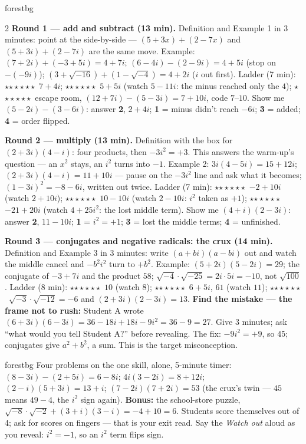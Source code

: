 \documentclass[10pt]{article}
\newcommand{\rung}[1]{{\color{goldacc}\ifcase#1\or$\star$\or$\star\star$\or$\star\star\star$\fi}}
\begin{document}
\begin{skillbox}{forestbg}
\begin{multicols}{2}
\textbf{Round 1 --- add and subtract (13 min).} Definition and Example 1 in 3 minutes: point at
the side-by-side --- $(5+3x)+(2-7x)$ and $(5+3i)+(2-7i)$ are the same move. Example:
$(7+2i)+(-3+5i)=4+7i$; $(6-4i)-(2-9i)=4+5i$ (stop on $-(-9i)$); $(3+\sqrt{-16})+(1-\sqrt{-4})
=4+2i$ ($i$ out first). Ladder (7 min): \rung1\ $7+4i$; \rung2\ $5+5i$ (watch $5-11i$: the minus
reached only the $4$); \rung3\ escape room, $(12+7i)-(5-3i)=7+10i$, code $7$--$10$. Show me
$(5-2i)-(3-6i)$: answer \textbf{2}, $2+4i$; \textbf{1} = minus didn't reach $-6i$; \textbf{3} =
added; \textbf{4} = order flipped.

\textbf{Round 2 --- multiply (13 min).} Definition with the box for $(2+3i)(4-i)$: four
products, then $-3i^2=+3$. This answers the warm-up's question --- an $x^2$ stays, an $i^2$
turns into $-1$. Example 2: $3i(4-5i)=15+12i$; $(2+3i)(4-i)=11+10i$ --- pause on the $-3i^2$
line and ask what it becomes; $(1-3i)^2=-8-6i$, written out twice. Ladder (7 min): \rung1\
$-2+10i$ (watch $2+10i$); \rung2\ $10-10i$ (watch $2-10i$: $i^2$ taken as $+1$); \rung3\
$-21+20i$ (watch $4+25i^2$: the lost middle term). Show me $(4+i)(2-3i)$: answer \textbf{2},
$11-10i$; \textbf{1} = $i^2=+1$; \textbf{3} = lost the middle terms; \textbf{4} = unfinished.

\columnbreak
\textbf{Round 3 --- conjugates and negative radicals: the crux (14 min).} Definition and
Example 3 in 3 minutes: write $(a+bi)(a-bi)$ out and watch the middle cancel and $-b^2i^2$ turn
to $+b^2$. Example: $(5+2i)(5-2i)=29$; the conjugate of $-3+7i$ and the product $58$;
$\sqrt{-4}\cdot\sqrt{-25}=2i\cdot5i=-10$, not $\sqrt{100}$. Ladder (8 min): \rung1\ $10$ (watch
$8$); \rung2\ $6+5i$, $61$ (watch $11$); \rung3\ $\sqrt{-3}\cdot\sqrt{-12}=-6$ and
$(2+3i)(2-3i)=13$. \textbf{Find the mistake --- the frame not to rush:} Student A wrote
$(6+3i)(6-3i)=36-18i+18i-9i^2=36-9=27$. Give 3 minutes; ask ``what would you tell Student A?''
before revealing. The fix: $-9i^2=+9$, so $45$; conjugates give $a^2+b^2$, a sum. This is the
target misconception.
\end{multicols}
\end{skillbox}

\boxguard
\begin{skillbox}{forestbg}
Four problems on the one skill, alone, 5-minute timer: $(8-3i)-(2+5i)=6-8i$;
$4i(3-2i)=8+12i$; $(2-i)(5+3i)=13+i$; $(7-2i)(7+2i)=53$ (the crux's twin --- $45$ means
$49-4$, the $i^2$ sign again). \textbf{Bonus:} the school-store puzzle,
$\sqrt{-8}\cdot\sqrt{-2}+(3+i)(3-i)=-4+10=6$. Students score themselves out of 4; ask for
scores on fingers --- that is your exit read. Say the \emph{Watch out} aloud as you reveal:
$i^2=-1$, so an $i^2$ term flips sign.
\end{skillbox}
\end{document}
